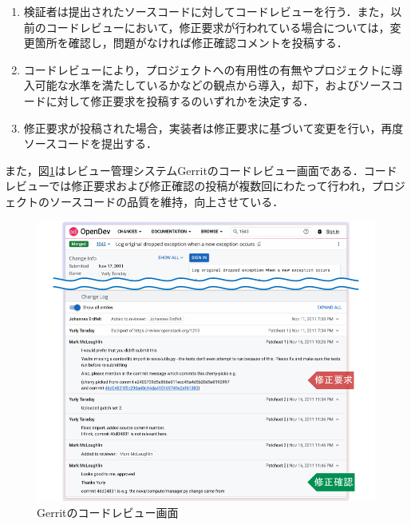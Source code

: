 \documentclass[11pt]{jreport}
\begin{document}
\begin{enumerate}[label=\textbf{ステップ\arabic*:}, leftmargin=75pt]
\item 検証者は提出されたソースコードに対してコードレビューを行う．また，以前のコードレビューにおいて，修正要求が行われている場合については，変更箇所を確認し，問題がなければ修正確認コメントを投稿する．
\item コードレビューにより，プロジェクトへの有用性の有無やプロジェクトに導入可能な水準を満たしているかなどの観点から導入，却下，およびソースコードに対して修正要求を投稿するのいずれかを決定する．
\item 修正要求が投稿された場合，実装者は修正要求に基づいて変更を行い，再度ソースコードを提出する．
\end{enumerate}

また，図\ref{fig:code_review}はレビュー管理システムGerritのコードレビュー画面である．コードレビューでは修正要求および修正確認の投稿が複数回にわたって行われ，プロジェクトのソースコードの品質を維持，向上させている．

\begin{figure}[t]
\centerline{\includegraphics[width=1.0\linewidth]{@BSthesis2024_Kawasaki/BSthesis2024_Kawasaki_fig/code_review.pdf}}
\caption{Gerritのコードレビュー画面}
\label{fig:code_review}
\end{figure}
\end{document}
